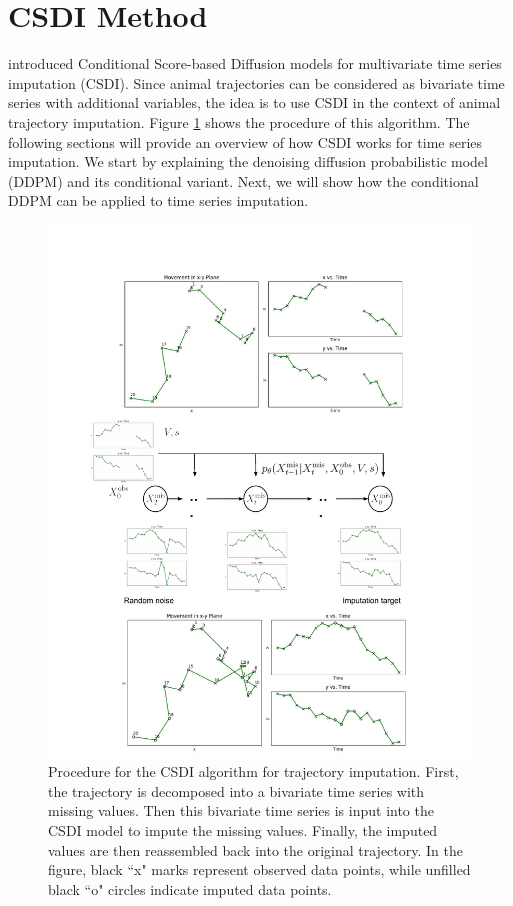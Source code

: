 \documentclass[11pt]{article}
\begin{document}
\section{CSDI Method}
\citet{tashiro2021csdi} introduced Conditional Score-based Diffusion models for multivariate time series imputation (CSDI). Since animal trajectories can be considered as bivariate time series with additional variables, the idea is to use CSDI in the context of animal trajectory imputation. Figure \ref{fig: visualization of the CSDI for trajectory imputation} shows the procedure of this algorithm. The following sections will provide an overview of how CSDI works for time series imputation. We start by explaining the denoising diffusion probabilistic model (DDPM) and its conditional variant. Next, we will show how the conditional DDPM can be applied to time series imputation. 

\begin{figure}[h]
  \centering
  \includegraphics[width=\textwidth]{../figure/algorithm} %
  \caption{Procedure for the CSDI algorithm for trajectory imputation. First, the trajectory is decomposed into a bivariate time series with missing values. Then this bivariate time series is input into the CSDI model to impute the missing values. Finally, the imputed values are then reassembled back into the original trajectory. In the figure, black ``x" marks represent observed data points, while unfilled black ``o" circles indicate imputed data points.}
  \label{fig: visualization of the CSDI for trajectory imputation} %
\end{figure}
\end{document}
